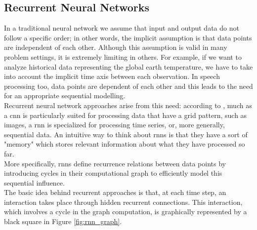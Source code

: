 \subsection{Recurrent Neural Networks}
In a traditional neural network we assume that input and output data do not follow a specific order; in other words, the implicit assumption is that data points are independent of each other. Although this assumption is valid in many problem settings, it is extremely limiting in others. For example, if we want to analyze historical data representing the global earth temperature, we have to take into account the implicit time axis between each observation. In speech processing too, data points are dependent of each other and this leads to the need for an appropriate sequential modelling. \\
Recurrent neural network approaches arise from this need: according to \cite{goodfellow2016deep}, much as a \gls{cnn} is particularly suited for processing data that have a grid pattern, such as images, a \gls{rnn} is specialized for processing time series, or, more generally, sequential data. An intuitive way to think about \gls{rnn}s is that they have a sort of "memory" which stores relevant information about what they have processed so far. \\
More specifically, \gls{rnn}s define recurrence relations between data points by introducing cycles in their computational graph to efficiently model this sequential influence. \\
The basic idea behind recurrent approaches is that, at each time step, an interaction takes place through hidden recurrent connections. This interaction, which involves a cycle in the graph computation, is graphically represented by a black square in Figure \ref{fig:rnn_graph}. \\
